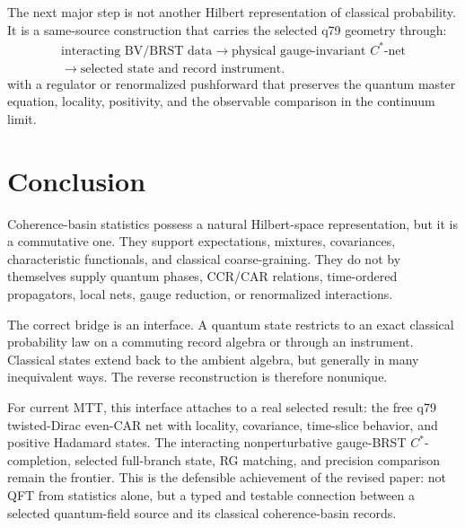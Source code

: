 \documentclass[11pt]{article}
\begin{document}
The next major step is not another Hilbert representation of classical
probability.  It is a same-source construction that carries the selected
q79 geometry through:
\[
\begin{gathered}
 \text{interacting BV/BRST data}
 \longrightarrow
 \text{physical gauge-invariant }C^*\text{-net}\\
 \longrightarrow
 \text{selected state and record instrument}.
\end{gathered}
\]
with a regulator or renormalized pushforward that preserves the quantum
master equation, locality, positivity, and the observable comparison in the
continuum limit.

\section{Conclusion}

Coherence-basin statistics possess a natural Hilbert-space representation,
but it is a commutative one.  They support expectations, mixtures,
covariances, characteristic functionals, and classical coarse-graining.
They do not by themselves supply quantum phases, CCR/CAR relations,
time-ordered propagators, local nets, gauge reduction, or renormalized
interactions.

The correct bridge is an interface.  A quantum state restricts to an exact
classical probability law on a commuting record algebra or through an
instrument.  Classical states extend back to the ambient algebra, but
generally in many inequivalent ways.  The reverse reconstruction is
therefore nonunique.

For current MTT, this interface attaches to a real selected result: the
free q79 twisted-Dirac even-CAR net with locality, covariance, time-slice
behavior, and positive Hadamard states.  The interacting nonperturbative
gauge-BRST \(C^*\)-completion, selected full-branch state, RG matching, and
precision comparison remain the frontier.  This is the defensible
achievement of the revised paper: not QFT from statistics alone, but a
typed and testable connection between a selected quantum-field source and
its classical coherence-basin records.



\end{document}
